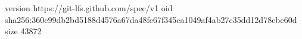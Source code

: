 version https://git-lfs.github.com/spec/v1
oid sha256:360c99db2bd5188d4576a67da48fe67f345ca1049af4ab27c35dd12d78ebe60d
size 43872
